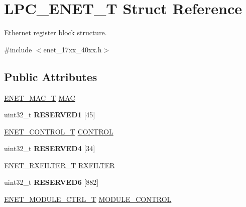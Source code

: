 \hypertarget{struct_l_p_c___e_n_e_t___t}{\section{L\+P\+C\+\_\+\+E\+N\+E\+T\+\_\+\+T Struct Reference}
\label{struct_l_p_c___e_n_e_t___t}
}


Ethernet register block structure.  




{\ttfamily \#include $<$enet\+\_\+17xx\+\_\+40xx.\+h$>$}

\subsection*{Public Attributes}
\begin{DoxyCompactItemize}
\item 
\hyperlink{struct_e_n_e_t___m_a_c___t}{E\+N\+E\+T\+\_\+\+M\+A\+C\+\_\+\+T} \hyperlink{struct_l_p_c___e_n_e_t___t_a2f1d337b7206673d31a165cee9c6b1aa}{M\+A\+C}
\item 
\hypertarget{struct_l_p_c___e_n_e_t___t_a5dd6bf9f10045f3599a60d157f38598b}{uint32\+\_\+t {\bfseries R\+E\+S\+E\+R\+V\+E\+D1} \mbox{[}45\mbox{]}}\label{struct_l_p_c___e_n_e_t___t_a5dd6bf9f10045f3599a60d157f38598b}

\item 
\hyperlink{struct_e_n_e_t___c_o_n_t_r_o_l___t}{E\+N\+E\+T\+\_\+\+C\+O\+N\+T\+R\+O\+L\+\_\+\+T} \hyperlink{struct_l_p_c___e_n_e_t___t_a40bc06ba6a0ce4949f8a94550cfc9798}{C\+O\+N\+T\+R\+O\+L}
\item 
\hypertarget{struct_l_p_c___e_n_e_t___t_a21834684d9ccdf758a76d847fce309d1}{uint32\+\_\+t {\bfseries R\+E\+S\+E\+R\+V\+E\+D4} \mbox{[}34\mbox{]}}\label{struct_l_p_c___e_n_e_t___t_a21834684d9ccdf758a76d847fce309d1}

\item 
\hyperlink{struct_e_n_e_t___r_x_f_i_l_t_e_r___t}{E\+N\+E\+T\+\_\+\+R\+X\+F\+I\+L\+T\+E\+R\+\_\+\+T} \hyperlink{struct_l_p_c___e_n_e_t___t_a4076c6a080ba8b6e6e7af7343408080b}{R\+X\+F\+I\+L\+T\+E\+R}
\item 
\hypertarget{struct_l_p_c___e_n_e_t___t_a69971bdb50272af4d797c243b68a640a}{uint32\+\_\+t {\bfseries R\+E\+S\+E\+R\+V\+E\+D6} \mbox{[}882\mbox{]}}\label{struct_l_p_c___e_n_e_t___t_a69971bdb50272af4d797c243b68a640a}

\item 
\hyperlink{struct_e_n_e_t___m_o_d_u_l_e___c_t_r_l___t}{E\+N\+E\+T\+\_\+\+M\+O\+D\+U\+L\+E\+\_\+\+C\+T\+R\+L\+\_\+\+T} \hyperlink{struct_l_p_c___e_n_e_t___t_a279749cd4018c81be5aa07edfe62d3e7}{M\+O\+D\+U\+L\+E\+\_\+\+C\+O\+N\+T\+R\+O\+L}
\end{DoxyCompactItemize}


